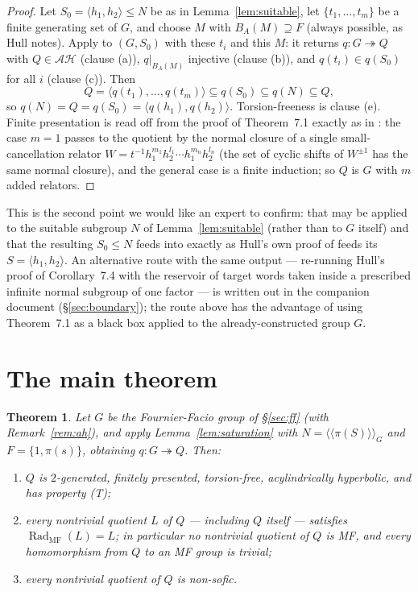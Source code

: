 \documentclass[11pt]{amsart}
\newtheorem{theorem}{Theorem}[section]
\theoremstyle{remark}
\theoremstyle{definition}
\newcommand{\RadMF}{\operatorname{Rad}_{\mathrm{MF}}}
\newcommand{\ncl}[1]{\langle\!\langle #1\rangle\!\rangle}
\begin{document}
\begin{proof}
Let $S_0=\langle h_1,h_2\rangle\leq N$ be as in
Lemma~\ref{lem:suitable}, let $\{t_1,\dots,t_m\}$ be a finite generating set
of $G$, and choose $M$ with $B_A(M)\supseteq F$ (always possible, as Hull
notes).  Apply \cite[Theorem~7.1]{Hull16} to $(G,S_0)$ with these $t_i$ and
this $M$: it returns $q\colon G\twoheadrightarrow Q$ with $Q\in\mathcal{AH}$
(clause (a)), $q|_{B_A(M)}$ injective (clause (b)), and $q(t_i)\in q(S_0)$
for all $i$ (clause (c)).  Then
\[
Q=\langle q(t_1),\dots,q(t_m)\rangle\subseteq q(S_0)\subseteq q(N)\subseteq Q,
\]
so $q(N)=Q=q(S_0)=\langle q(h_1),q(h_2)\rangle$.  Torsion-freeness is clause
(e).  Finite presentation is read off from the proof of Theorem~7.1 exactly
as in \cite{FFF}: the case $m=1$ passes to the quotient by the normal
closure of a single small-cancellation relator
$W=t^{-1}h_1^{m_1}h_2^{l_1}\cdots h_1^{m_n}h_2^{l_n}$ (the set of cyclic
shifts of $W^{\pm1}$ has the same normal closure), and the general case is a
finite induction; so $Q$ is $G$ with $m$ added relators.
\end{proof}

This is the second point we would like an expert to confirm: that
\cite[Corollary~5.7]{Hull16} may be applied to the suitable subgroup $N$ of
Lemma~\ref{lem:suitable} (rather than to $G$ itself) and that the resulting
$S_0\leq N$ feeds into \cite[Theorem~7.1]{Hull16} exactly as Hull's own
proof of \cite[Corollary~7.4]{Hull16} feeds its $S=\langle h_1,h_2\rangle$.
An alternative route with the same output --- re-running Hull's proof of
Corollary~7.4 with the reservoir of target words taken inside a prescribed
infinite normal subgroup of one factor --- is written out in the companion
document (\S\ref{sec:boundary}); the route above has the advantage of using
Theorem~7.1 as a black box applied to the already-constructed group $G$.

\section{The main theorem}\label{sec:main}

\begin{theorem}\label{thm:main}
Let $G$ be the Fournier-Facio group of \S\textup{\ref{sec:ff}} (with
Remark~\textup{\ref{rem:ah}}), and apply Lemma~\textup{\ref{lem:saturation}}
with $N=\ncl{\pi(S)}_G$ and $F=\{1,\pi(s)\}$, obtaining
$q\colon G\twoheadrightarrow Q$.  Then:
\begin{enumerate}
\item $Q$ is $2$-generated, finitely presented, torsion-free,
  acylindrically hyperbolic, and has property \textup{(T)};
\item every nontrivial quotient $L$ of $Q$ --- including $Q$ itself ---
  satisfies $\RadMF(L)=L$; in particular no nontrivial quotient of $Q$ is
  MF, and every homomorphism from $Q$ to an MF group is trivial;
\item every nontrivial quotient of $Q$ is non-sofic.
\end{enumerate}
\end{theorem}
\end{document}
